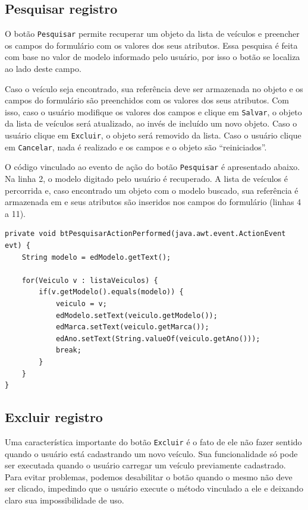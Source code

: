 \subsection{Pesquisar registro}

O botão \texttt{Pesquisar} permite recuperar um objeto da lista de veículos e preencher os campos do formulário com os valores dos seus atributos. Essa pesquisa é feita com base no valor de modelo informado pelo usuário, por isso o botão se localiza ao lado deste campo.

Caso o veículo seja encontrado, sua referência deve ser armazenada no objeto  e os campos do formulário são preenchidos com os valores dos seus atributos. Com isso, caso o usuário modifique os valores dos campos e clique em \texttt{Salvar}, o objeto da lista de veículos será atualizado, ao invés de incluído um novo objeto. Caso o usuário clique em \texttt{Excluir}, o objeto será removido da lista. Caso o usuário clique em \texttt{Cancelar}, nada é realizado e os campos e o objeto são ``reiniciados''.

O código vinculado ao evento de ação do botão \texttt{Pesquisar} é apresentado abaixo. Na linha 2, o modelo digitado pelo usuário é recuperado. A lista de veículos é percorrida e, caso encontrado um objeto com o modelo buscado, sua referência é armazenada em  e seus atributos são inseridos nos campos do formulário (linhas 4 a 11).

\begin{verbatim}
private void btPesquisarActionPerformed(java.awt.event.ActionEvent evt) {
	String modelo = edModelo.getText();

	for(Veiculo v : listaVeiculos) {
		if(v.getModelo().equals(modelo)) {
			veiculo = v;
			edModelo.setText(veiculo.getModelo());
			edMarca.setText(veiculo.getMarca());
			edAno.setText(String.valueOf(veiculo.getAno()));
			break;
		}
	}
}
\end{verbatim}

\subsection{Excluir registro}

Uma característica importante do botão \texttt{Excluir} é o fato de ele não fazer sentido quando o usuário está cadastrando um novo veículo. Sua funcionalidade só pode ser executada quando o usuário carregar um veículo previamente cadastrado. Para evitar problemas, podemos desabilitar o botão quando o mesmo não deve ser clicado, impedindo que o usuário execute o método vinculado a ele e deixando claro sua impossibilidade de uso.

